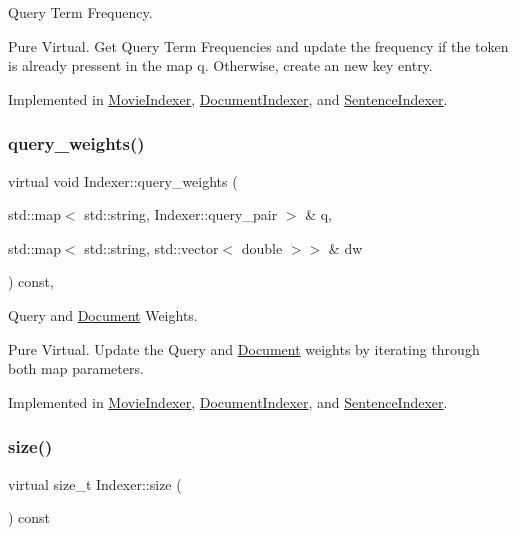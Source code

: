 Query Term Frequency. 

Pure Virtual. Get Query Term Frequencies and update the frequency if the token is already pressent in the map q. Otherwise, create an new key entry. 

Implemented in \hyperlink{class_movie_indexer_a982d10037e8307649ee62eda078ae531}{Movie\+Indexer}, \hyperlink{class_document_indexer_a48d441022f2f6ea3437f5a67b318e06e}{Document\+Indexer}, and \hyperlink{class_sentence_indexer_af059ce5526fad2995f5595ace00e51a3}{Sentence\+Indexer}.

\mbox{\label{class_indexer_a74819336b6d9883483c09349ebdf43b8}} 
\subsubsection{\texorpdfstring{query\+\_\+weights()}{query\_weights()}}
{\footnotesize\ttfamily virtual void Indexer\+::query\+\_\+weights (\begin{DoxyParamCaption}\item[{std\+::map$<$ std\+::string, Indexer\+::query\+\_\+pair $>$ \&}]{q,  }\item[{std\+::map$<$ std\+::string, std\+::vector$<$ double $>$$>$ \&}]{dw }\end{DoxyParamCaption}) const\hspace{0.3cm}{\ttfamily [protected]}, {}}



Query and \hyperlink{class_document}{Document} Weights. 

Pure Virtual. Update the Query and \hyperlink{class_document}{Document} weights by iterating through both map parameters. 

Implemented in \hyperlink{class_movie_indexer_a7a01d72125aa96e5d286a2bd0cb13ab8}{Movie\+Indexer}, \hyperlink{class_document_indexer_ad9a1b17fec1c999e98b58e3433727f05}{Document\+Indexer}, and \hyperlink{class_sentence_indexer_ad3835aaf2ff4a59fff85d596dfc95d5c}{Sentence\+Indexer}.

\mbox{\label{class_indexer_ab8b3e17bbf16d54e1e773a1630abb138}} 
\subsubsection{\texorpdfstring{size()}{size()}}
{\footnotesize\ttfamily virtual size\+\_\+t Indexer\+::size (\begin{DoxyParamCaption}{ }\end{DoxyParamCaption}) const\hspace{0.3cm}{\ttfamily [pure virtual]}}




